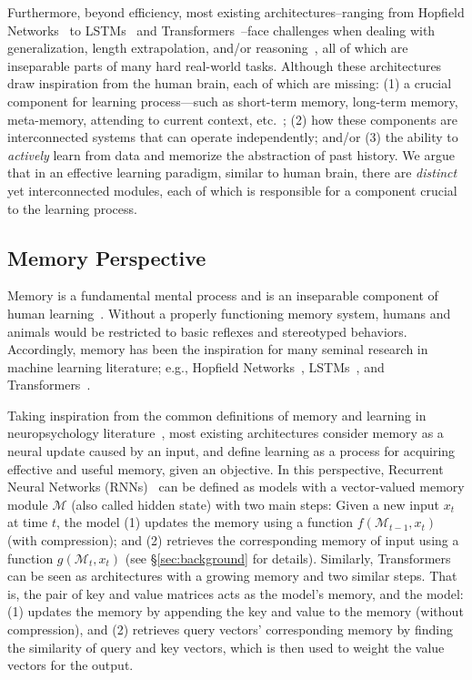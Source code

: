 \documentclass{article}
\newcommand{\citep}{\parencite}
\newcommand{\M}[0]{\mathcal{M}}
\begin{document}
Furthermore, beyond efficiency, most existing architectures–ranging from Hopfield Networks~\citep{hopfield1982neural} to LSTMs~\citep{LSTM} and Transformers~\citep{transformers}–face challenges when dealing with generalization, length extrapolation, and/or reasoning~\citep{anil2022exploring, qin2024exploring}, all of which are inseparable parts of many hard real-world tasks. Although these architectures draw inspiration from the human brain, each of which are missing: (1) a crucial component for learning process—such as short-term memory, long-term memory, meta-memory, attending to current context, etc.~\citep{cowan2008differences}; (2) how these components are interconnected systems that can operate independently; and/or (3) the ability to \emph{actively} learn from data and memorize the abstraction of past history. We argue that in an effective learning paradigm, similar to human brain, there are \emph{distinct} yet interconnected modules, each of which is responsible for a component crucial to the learning process.

\subsection*{\textcolor{c3}{Memory Perspective}}
Memory is a fundamental mental process and is an inseparable component of human learning~\citep{terry2017learning}. Without a properly functioning memory system, humans and animals would be restricted to basic reflexes and stereotyped behaviors. Accordingly, memory has been the inspiration for many seminal research in machine learning literature; e.g., Hopfield Networks~\citep{hopfield1982neural}, LSTMs~\citep{LSTM}, and Transformers~\citep{transformers}. 

Taking inspiration from the common definitions of memory and learning in neuropsychology literature~\citep{okano2000learning}, most existing architectures consider memory as a neural update caused by an input, and define learning as a process for acquiring effective and useful memory, given an objective. In this perspective, Recurrent Neural Networks (RNNs)~\citep{williams1989learning} can be defined as models with a vector-valued memory module $\M$ (also called hidden state) with two main steps: Given a new input $x_t$ at time $t$, the model (1) updates the memory using a function $f(\M_{t-1}, x_t)$ (with compression); and (2) retrieves the corresponding memory of input using a function $g(\M_{t}, x_t)$ (\textcolor{c1}{see \S}\ref{sec:background} \textcolor{c1}{for details}). Similarly, Transformers can be seen as architectures with a growing memory and two similar steps. That is, the pair of key and value matrices acts as the model's memory, and the model: (1) updates the memory by appending the key and value to the memory (without compression), and (2) retrieves query vectors' corresponding memory by finding the similarity of query and key vectors, which is then used to weight the value vectors for the output.
\end{document}
